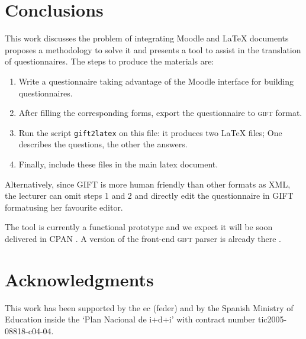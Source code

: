 \documentclass{pracjourn}[2006/02/20]
\begin{document}

\section{Conclusions}
\label{section:conclusiones}
%

This work discusses the problem of integrating Moodle and LaTeX{} documents
proposes a methodology to solve it and presents a tool to assist 
in the translation of questionnaires.
The steps to produce the materials are:
\begin{enumerate}
\item 
Write a questionnaire 
taking advantage of the 
Moodle interface for building questionnaires.
\item After filling the corresponding forms,
export the questionnaire to \textsc{gift} format.
\item
Run the script \texttt{gift2latex} on this file: it produces two \LaTeX{} files; 
One describes the questions, the other the answers. 
%
\item
Finally, include these files in the main latex document. 
\end{enumerate}
Alternatively, since GIFT is more human friendly than other formats as XML, 
the lecturer can omit steps 1 and 2 and directly edit the questionnaire in GIFT formatusing her favourite editor.

The tool is currently a functional prototype and we
expect it will be soon delivered in CPAN 
\cite{url:cpan}. 
A version of the front-end \textsc{gift} parser is already there \cite{url:gift2latex}.



\section{Acknowledgments}

This work has been supported by the {\sc ec (feder)} and by the Spanish Ministry of 
Education inside the `Plan Nacional de {\sc i+d+i}' with contract number 
{\sc tic2005-08818-c04-04}.

%
%

  
\end{document}
